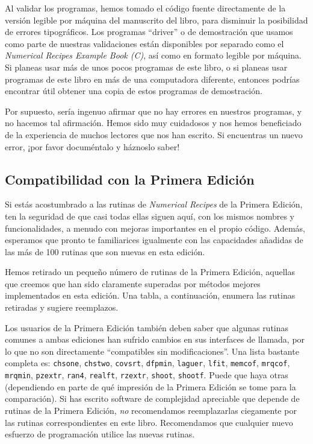 \documentclass[10pt,a4paper]{book}
\begin{document}
\medskip

Al validar los programas, hemos tomado el código fuente directamente de la versión legible por máquina del manuscrito del libro, para disminuir la posibilidad de errores tipográficos. Los programas “driver” o de demostración que usamos como parte de nuestras validaciones están disponibles por separado como el \textit{Numerical Recipes Example Book (C)}, así como en formato legible por máquina. Si planeas usar más de unos pocos programas de este libro, o si planeas usar programas de este libro en más de una computadora diferente, entonces podrías encontrar útil obtener una copia de estos programas de demostración.

\medskip

Por supuesto, sería ingenuo afirmar que no hay errores en nuestros programas, y no hacemos tal afirmación. Hemos sido muy cuidadosos y nos hemos beneficiado de la experiencia de muchos lectores que nos han escrito. Si encuentras un nuevo error, ¡por favor documéntalo y háznoslo saber!

\subsection{Compatibilidad con la Primera Edición}

Si estás acostumbrado a las rutinas de \textit{Numerical Recipes} de la Primera Edición, ten la seguridad de que casi todas ellas siguen aquí, con los mismos nombres y funcionalidades, a menudo con mejoras importantes en el propio código. Además, esperamos que pronto te familiarices igualmente con las capacidades añadidas de las más de 100 rutinas que son nuevas en esta edición.

\medskip

Hemos retirado un pequeño número de rutinas de la Primera Edición, aquellas que creemos que han sido claramente superadas por métodos mejores implementados en esta edición. Una tabla, a continuación, enumera las rutinas retiradas y sugiere reemplazos.

\medskip

Los usuarios de la Primera Edición también deben saber que algunas rutinas comunes a ambas ediciones han sufrido cambios en sus interfaces de llamada, por lo que no son directamente “compatibles sin modificaciones”. Una lista bastante completa es: \texttt{chsone}, \texttt{chstwo}, \texttt{covsrt}, \texttt{dfpmin}, \texttt{laguer}, \texttt{lfit}, \texttt{memcof}, \texttt{mrqcof}, \texttt{mrqmin}, \texttt{pzextr}, \texttt{ran4}, \texttt{realft}, \texttt{rzextr}, \texttt{shoot}, \texttt{shootf}. Puede que haya otras (dependiendo en parte de qué impresión de la Primera Edición se tome para la comparación). Si has escrito software de complejidad apreciable que depende de rutinas de la Primera Edición, \textit{no} recomendamos reemplazarlas ciegamente por las rutinas correspondientes en este libro. Recomendamos que cualquier nuevo esfuerzo de programación utilice las nuevas rutinas.
\end{document}
